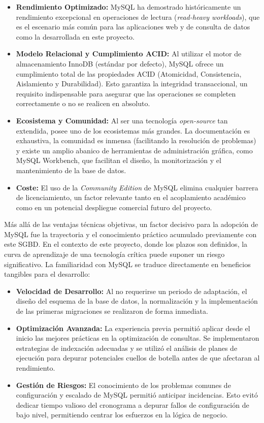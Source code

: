 \begin{itemize}
    \item \textbf{Rendimiento Optimizado:} MySQL ha demostrado históricamente un rendimiento excepcional en operaciones de lectura (\textit{read-heavy workloads}), que es el escenario más común para las aplicaciones web y de consulta de datos como la desarrollada en este proyecto.
    \item \textbf{Modelo Relacional y Cumplimiento ACID:} Al utilizar el motor de almacenamiento InnoDB (estándar por defecto), MySQL ofrece un cumplimiento total de las propiedades ACID (Atomicidad, Consistencia, Aislamiento y Durabilidad). Esto garantiza la integridad transaccional, un requisito indispensable para asegurar que las operaciones se completen correctamente o no se realicen en absoluto.
    \item \textbf{Ecosistema y Comunidad:} Al ser una tecnología \textit{open-source} tan extendida, posee uno de los ecosistemas más grandes. La documentación es exhaustiva, la comunidad es inmensa (facilitando la resolución de problemas) y existe un amplio abanico de herramientas de administración gráfica, como MySQL Workbench, que facilitan el diseño, la monitorización y el mantenimiento de la base de datos.
    \item \textbf{Coste:} El uso de la \textit{Community Edition} de MySQL elimina cualquier barrera de licenciamiento, un factor relevante tanto en el acoplamiento académico como en un potencial despliegue comercial futuro del proyecto.
\end{itemize}

Más allá de las ventajas técnicas objetivas, un factor decisivo para la adopción de MySQL fue la trayectoria y el conocimiento práctico acumulado previamente con este SGBD. En el contexto de este proyecto, donde los plazos son definidos, la curva de aprendizaje de una tecnología crítica puede suponer un riesgo significativo. La familiaridad con MySQL se traduce directamente en beneficios tangibles para el desarrollo:

\begin{itemize}
    \item \textbf{Velocidad de Desarrollo:} Al no requerirse un periodo de adaptación, el diseño del esquema de la base de datos, la normalización y la implementación de las primeras migraciones se realizaron de forma inmediata.
    \item \textbf{Optimización Avanzada:} La experiencia previa permitió aplicar desde el inicio las mejores prácticas en la optimización de consultas. Se implementaron estrategias de indexación adecuadas y se utilizó el análisis de planes de ejecución para depurar potenciales cuellos de botella antes de que afectaran al rendimiento.
    \item \textbf{Gestión de Riesgos:} El conocimiento de los problemas comunes de configuración y escalado de MySQL permitió anticipar incidencias. Esto evitó dedicar tiempo valioso del cronograma a depurar fallos de configuración de bajo nivel, permitiendo centrar los esfuerzos en la lógica de negocio.
\end{itemize}

